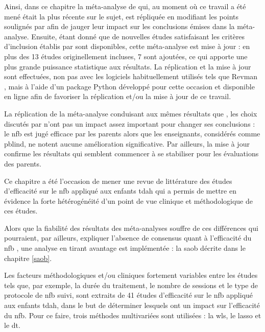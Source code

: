 Ainsi, dans ce chapitre la méta-analyse de \citet{Cortese2016} qui, au moment où ce travail a été mené était la plus récente sur le sujet, est répliquée en modifiant 
les points soulignés par \citet{Micoulaud2016} afin de jauger leur impact sur les conclusions émises dans la méta-analyse. Ensuite, étant donné que de nouvelles études 
satisfaisant les critères d'inclusion établis par \citet{Cortese2016} sont disponibles, cette méta-analyse est mise à jour : en plus des 13 études originellement incluses, 7
sont ajoutées, ce qui apporte une plus grande puissance statistique aux résultats. La réplication et la mise à jour sont effectuées, non pas avec les logiciels 
habituellement utilisés tels que Revman \citep{Revman}, mais à l'aide d'un package Python développé pour cette occasion et disponible en ligne afin de favoriser 
la réplication et/ou la mise à jour de ce travail. 

La réplication de la méta-analyse conduisant aux mêmes résultats que \citet{Cortese2016}, les choix discutés par \citet{Micoulaud2016} n'ont pas un impact assez
important pour changer ses conclusions : le \gls{nfb} est jugé efficace par les parents alors que les enseignants, considérés comme \gls{pblind}, ne notent aucune
amélioration significative. Par ailleurs, la mise à jour confirme les résultats qui semblent commencer à se stabiliser pour les évaluations des parents.


Ce chapitre a été l'occasion de mener une revue de littérature des études d'efficacité sur le \gls{nfb} appliqué aux enfants \gls{tdah} 
qui a permis de mettre en évidence la forte hétérogénéité d'un point de vue clinique et méthodologique de ces études. 

Alors que la fiabilité des résultats des méta-analyses souffre de ces différences qui pourraient, par ailleurs, expliquer l'absence de consensus quant 
à l'efficacité du \gls{nfb} \citep{Alkoby2017}, une analyse en tirant avantage est implémentée : la \gls{saob} décrite dans le chapitre \ref{saob}. 

Les facteurs méthodologiques et/ou cliniques fortement variables entre les études tels que, par exemple, la durée du traitement, le nombre de sessions et le type 
de protocole de \gls{nfb} suivi, sont extraits de 41 études d'efficacité sur le \gls{nfb} appliqué aux enfants \gls{tdah}, dans le but de déterminer lesquels 
ont un impact sur l'efficacité du \gls{nfb}. Pour ce faire, trois méthodes multivariées sont utilisées : la \gls{wls}, le \gls{lasso} et le \gls{dt}. 

